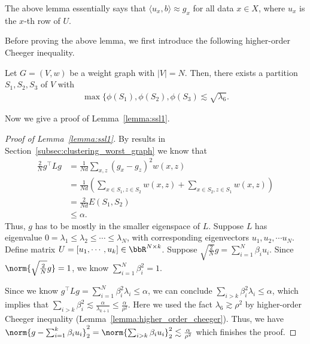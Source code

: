 The above lemma essentially says that $\langle u_x, b \rangle\approx g_x$ for all data $x\in X$, where $u_x$ is the $x$-th row of $U$. 

Before proving the above lemma, we first introduce the following higher-order Cheeger inequality. 
\begin{lemma}\label{lemma:higher_order_cheeger}
	Let $G=(V, w)$ be a weight graph with $|V|=N$.  Then, there exists a partition $S_1, S_2, S_{3}$ of $V$ with 
	\begin{align*}
		\max\{\phi(S_1), \phi(S_2), \phi(S_3)\lesssim \sqrt{\lambda_{6}}.
	\end{align*}
\end{lemma}

Now we give a proof of Lemma~\ref{lemma:ssl1}.
\begin{proof}[Proof of Lemma~\ref{lemma:ssl1}]
	By results in Section~\ref{subsec:clustering_worst_graph} we know that 
\begin{align}
	\frac{2}{N} g^\top L g &= \frac{1}{Nd} \sum_{x, z} (g_x - g_z)^2 w(x, z)\\
	&= \frac{1}{Nd} \left(\sum_{x\in S_1, z\in S_2} w(x, z) + \sum_{x\in S_2, z\in S_1} w(x, z)\right)\\
	&= \frac{2}{Nd} E(S_1, S_2) \\
	&\le \alpha.
\end{align}
Thus, $g$ has to be mostly in the smaller eigenspace of $L$.  Suppose $L$ has eigenvalue $0=\lambda_1\le\lambda_2 \le \cdots \le \lambda_N $, with corresponding eigenvectors $u_1, u_2, \cdots u_N$. Define matrix $U=[u_1, \cdots, u_k] \in \bbR^{N\times k}$. Suppose $\sqrt{\frac{2}{N}}g = \sum_{i=1}^N \beta_i u_i$. Since $\norm{\sqrt{\frac{2}{N}}g}=1$, we know $\sum_{i=1}^N \beta_i^2 = 1$.

Since we know $g^\top L g = \sum_{i=1}^N \beta_i^2 \lambda_i \le \alpha$, we can conclude $\sum_{i>k} \beta_i^2 \lambda_i \le \alpha$, which implies that $\sum_{i>k}\beta_i^2 \lesssim \frac{\alpha}{\lambda_{k+1}} \le \frac{\alpha}{\rho^2}$. Here we used the fact $\lambda_6 \gtrsim \rho^2$ by higher-order Cheeger inequality (Lemma~\ref{lemma:higher_order_cheeger}). Thus, we have $\norm{g-\sum_{i=1}^k \beta_i u_i}_2^2 = \norm{\sum_{i>k} \beta_i u_i}_2^2 \lesssim \frac{\alpha}{\rho^2}$ which finishes the proof. 

\end{proof}